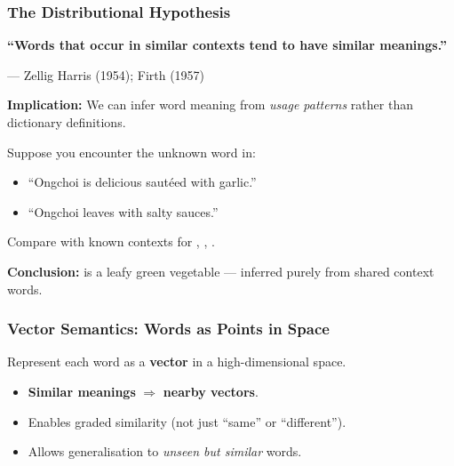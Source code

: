 \separator

\subsubsection{The Distributional Hypothesis}

\begin{defbox}
\textbf{``Words that occur in similar contexts tend to have similar meanings.''}

\hfill --- Zellig Harris (1954); Firth (1957)

\separator

\textbf{Implication:} We can infer word meaning from \textit{usage patterns} rather than dictionary definitions.
\end{defbox}

\begin{exbox}
Suppose you encounter the unknown word  in:
\begin{itemize}
  \item ``Ongchoi is delicious saut\'{e}ed with garlic.''
  \item ``Ongchoi leaves with salty sauces.''
\end{itemize}
Compare with known contexts for , , .

\textbf{Conclusion:}  is a leafy green vegetable --- inferred purely from shared context words.
\end{exbox}

\separator

\subsubsection{Vector Semantics: Words as Points in Space}

\begin{defbox}
Represent each word as a \textbf{vector} in a high-dimensional space.

\begin{itemize}
  \item \textbf{Similar meanings} $\Rightarrow$ \textbf{nearby vectors}.
  \item Enables graded similarity (not just ``same'' or ``different'').
  \item Allows generalisation to \textit{unseen but similar} words.
\end{itemize}
\end{defbox}

